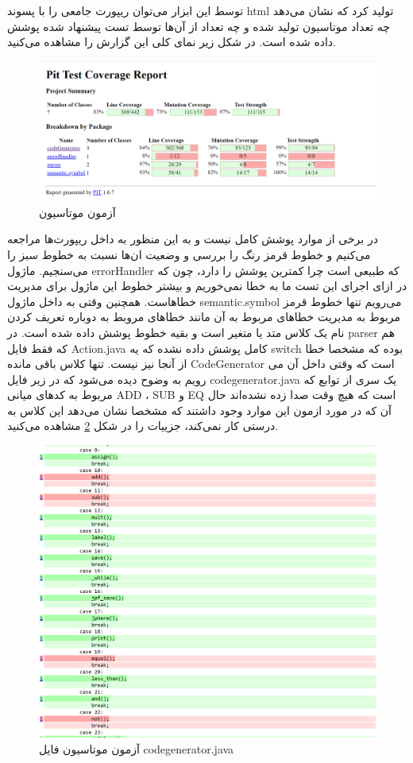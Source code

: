 توسط این ابزار می‌توان ریپورت جامعی را با پسوند html تولید کرد که نشان می‌دهد چه تعداد موتاسیون تولید شده و چه تعداد از آن‌ها توسط تست پیشنهاد شده پوشش داده شده است. 
در شکل زیر نمای کلی این گزارش را مشاهده می‌کنید. 

\begin{figure}[ht]
\centering
\includegraphics[scale=0.5]{PIT3.png}
\caption{آزمون موتاسیون}
\label{fig:9}
\end{figure}


در برخی از موارد پوشش کامل نیست و به این منظور به داخل ریپورت‌ها مراجعه می‌کنیم و خطوط قرمز رنگ را بررسی و وضعیت ان‌ها نسبت به خطوط سبز را می‌سنجیم.
ماژول errorHandler که طبیعی است چرا کمترین پوشش را دارد، چون که در ازای اجرای این تست ما به خطا نمی‌خوریم و بیشتر خطوط این ماژول برای مدیریت خطاهاست. همچنین وقتی به داخل ماژول semantic.symbol می‌رویم تنها خطوط قرمز مربوط به مدیریت خطاهای مربوط به آن مانند خطاهای مروبط به دوباره تعریف کردن نام یک کلاس متد یا متغیر است و بقیه خطوط پوشش داده شده است.
در parser هم که فقط فایل Action.java کامل پوشش داده نشده که یه switch بوده که مشخصا خطا از آنجا نیز نیست. تنها کلاس باقی مانده CodeGenerator است که وقتی داخل آن می رویم به وضوح دیده می‌شود که در زیر فایل codegenerator.java  یک سری از توابع که مربوط به کد‌های میانی ADD ، SUB و EQ است که هیچ وقت صدا زده نشده‌اند حال آن که در مورد ازمون این موارد وجود داشتند که مشخصا نشان می‌دهد این کلاس به درستی کار نمی‌کند، جزییات را در شکل \ref{fig:10} مشاهده می‌کنید.

\begin{figure}[htb]
\centering
\includegraphics[scale=0.4]{PIT4.png}
\caption{آزمون موتاسیون فایل codegenerator.java}
\label{fig:10}
\end{figure}


